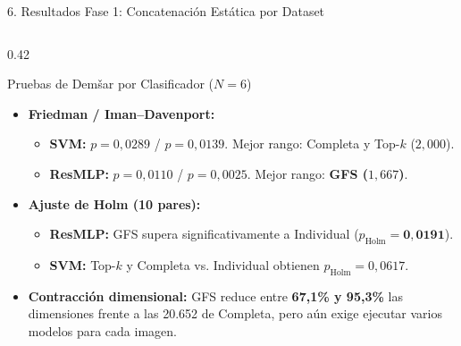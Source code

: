 \documentclass[aspectratio=169,10pt]{beamer}
\begin{document}
\begin{frame}{6. Resultados Fase 1: Concatenación Estática por Dataset}
\begin{columns}[T]
\begin{column}{0.42\textwidth}
\begin{block}{\scriptsize Pruebas de Demšar por Clasificador ($N=6$)}
\begin{itemize}
\item \textbf{Friedman / Iman--Davenport:}
  \begin{itemize}
  \item \scriptsize \textbf{SVM:} $p = 0{,}0289$ / $p = 0{,}0139$. Mejor rango: Completa y Top-$k$ ($2{,}000$).
  \item \scriptsize \textbf{ResMLP:} $p = 0{,}0110$ / $p = 0{,}0025$. Mejor rango: \textbf{GFS ($1{,}667$)}.
  \end{itemize}
\item \textbf{Ajuste de Holm (10 pares):}
  \begin{itemize}
  \item \scriptsize \textbf{ResMLP:} GFS supera significativamente a Individual ($p_{\text{Holm}} = \mathbf{0{,}0191}$).
  \item \scriptsize \textbf{SVM:} Top-$k$ y Completa vs. Individual obtienen $p_{\text{Holm}} = 0{,}0617$.
  \end{itemize}
\item \textbf{Contracción dimensional:} GFS reduce entre \textbf{67,1\% y 95,3\%} las dimensiones frente a las 20.652 de Completa, pero aún exige ejecutar varios modelos para cada imagen.
\end{itemize}
\end{block}
\end{column}
\end{columns}
\end{frame}
\end{document}
